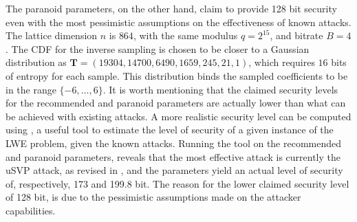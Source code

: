 The paranoid parameters, on the other hand, claim to provide 128 bit security even with the most pessimistic assumptions on the effectiveness of known attacks. The lattice dimension $n$ is $864$, with the same modulus $q=2^{15}$, and bitrate $B=4$. The CDF for the inverse sampling is chosen to be closer to a Gaussian distribution as $\mathbf{T}=(19304, 14700, 6490, 1659, 245, 21, 1)$, which requires $16$ bits of entropy for each sample. This distribution binds the sampled coefficients to be in the range $\{-6,\ldots,6\}$.
It is worth mentioning that the claimed security levels for the recommended and paranoid parameters are actually lower than what can be achieved with existing attacks. A more realistic security level can be computed using \cite{parameters}, a useful tool to estimate the level of security of a given instance of the LWE problem, given the known attacks. Running the tool on the recommended and paranoid parameters, reveals that the most effective attack is currently the uSVP attack, as revised in \cite{RUSVP}, and the parameters yield an actual level of security of, respectively, 173 and 199.8 bit. The reason for the lower claimed security level of 128 bit, is due to the pessimistic assumptions made on the attacker capabilities.

